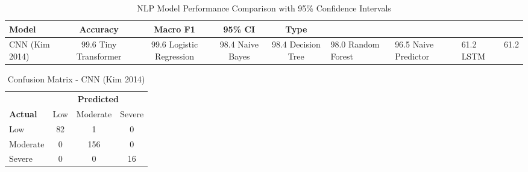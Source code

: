 \begin{table}[h]
\centering
\caption{NLP Model Performance Comparison with 95\% Confidence Intervals}
\label{tab:model_comparison}
\begin{tabular}{lcccc}
\hline
\textbf{Model} & \textbf{Accuracy} & \textbf{Macro F1} & \textbf{95\% CI} & \textbf{Type} \\
\hline
CNN (Kim 2014) & 99.6%
Tiny Transformer & 99.6%
Logistic Regression & 98.4%
Naive Bayes & 98.4%
Decision Tree & 98.0%
Random Forest & 96.5%
Naive Predictor & 61.2%
LSTM & 61.2%
\hline
\end{tabular}
\end{table}

\begin{table}[h]
\centering
\caption{Confusion Matrix - CNN (Kim 2014)}
\label{tab:confusion_cnn}
\begin{tabular}{lccc}
\hline
 & \multicolumn{3}{c}{\textbf{Predicted}} \\
\textbf{Actual} & Low & Moderate & Severe \\
\hline
Low & 82 & 1 & 0 \\
Moderate & 0 & 156 & 0 \\
Severe & 0 & 0 & 16 \\
\hline
\end{tabular}
\end{table}
